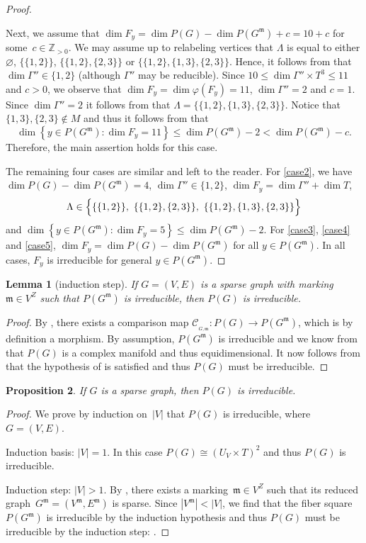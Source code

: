 \documentclass[12pt]{article}
\newtheorem{lemma}{Lemma}
\newtheorem{proposition}[lemma]{Proposition}
\theoremstyle{definition}
\newenvironment{Mlist}{\begin{itemize}[topsep=0pt,itemsep=0pt,leftmargin=7mm]}{\end{itemize}}
\newcommand{\st}{such that }
\renewcommand{\c}{\colon}
\newcommand{\set}[2]{\left\{#1:#2\right\}}
\newcommand{\Z}{{\mathbb{Z}}}
\newcommand{\cC}{\mathcal{C}}
\newcommand{\m}{\mathfrak{m}}
\newcommand{\CM}{\cC_{_{G,\m}}}
\begin{document}
\begin{proof}
\begin{Mlist}
Next, we assume that $\dim F_y=\dim P(G)-\dim P(G^\m)+c=10+c$ for some~$c\in \Z_{>0}$.
We may assume up to relabeling vertices that $\Lambda$
is equal to either $\varnothing$, $\{\{1,2\}\}$, $\{\{1,2\},\{2,3\}\}$ or $\{\{1,2\},\{1,3\},\{2,3\}\}$.
Hence, it follows from  that $\dim\Gamma''\in\{1,2\}$ (although $\Gamma''$ may be reducible).
Since $10\leq \dim \Gamma''\times T^3\leq 11$ and $c>0$,
we observe that $\dim F_y=\dim \varphi(F_y)=11$, $\dim \Gamma''=2$ and $c=1$.
Since $\dim \Gamma''=2$ it follows from  that $\Lambda=\{\{1,2\},\{1,3\},\{2,3\}\}$.
Notice that $\{1,3\},\{2,3\}\notin M$ and thus it follows from  that
\[
\dim\set{y\in P(G^\m)}{\dim F_y=11}\leq \dim P(G^\m)-2<\dim P(G^\m)-c.
\]
Therefore, the main assertion holds for this case.
\end{Mlist}
The remaining four cases are similar and left to the reader.
For \ref{case2}, we have
$\dim P(G)-\dim P(G^\m)=4$,
$\dim\Gamma''\in\{1,2\}$,
$\dim F_y=\dim\Gamma''+\dim T$,
\[
\Lambda\in\Bigl\{\{\{1,2\}\},~\{\{1,2\},\{2,3\}\},~\{\{1,2\},\{1,3\},\{2,3\}\}\Bigr\}
\]
and $\dim\set{y\in P(G^\m)}{\dim F_y=5}\leq \dim P(G^\m)-2$.
For \ref{case3}, \ref{case4} and \ref{case5},
$\dim F_y=\dim P(G)-\dim P(G^\m)$ for all $y\in P(G^\m)$.
In all cases, $F_y$ is irreducible for general $y\in P(G^\m)$.
\end{proof}



\begin{lemma}[induction step]
\label{lem:ip}
If $G=(V,E)$ is a sparse graph with marking $\m\in V^Z$
\st $P(G^\m)$ is irreducible,
then $P(G)$ is irreducible.
\end{lemma}

\begin{proof}
By ,
there exists a comparison map $\CM\c P(G)\to P(G^\m)$,
which is by definition a morphism.
By assumption, $P(G^\m)$ is irreducible and
we know from  that $P(G)$ is a complex manifold and thus equidimensional.
It now follows from  that the hypothesis of  is satisfied
and thus $P(G)$ must be irreducible.
\end{proof}

\begin{proposition}
\label{prp:PG}
If $G$ is a sparse graph, then $P(G)$ is irreducible.
\end{proposition}

\begin{proof}
We prove by induction on~$|V|$ that $P(G)$ is irreducible, where $G=(V,E)$.

Induction basis: $|V|=1$.
In this case $P(G)\cong (U_V\times T)^2$ and thus $P(G)$ is irreducible.

Induction step: $|V|>1$.
By , there exists a marking~$\m\in V^Z$
\st its reduced graph~$G^\m=(V^\m,E^\m)$ is sparse.
Since $|V^\m|<|V|$, we find that the fiber square~$P(G^\m)$ is irreducible by the induction hypothesis
and thus $P(G)$ must be irreducible by the induction step: .
\end{proof}
\end{document}
